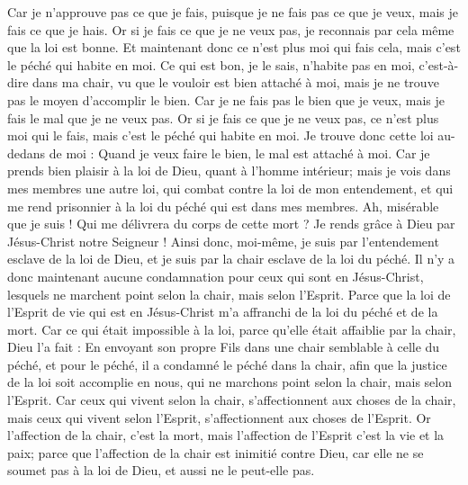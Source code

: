 \begin{multicols}{2}
Car je n'approuve pas ce que je fais, puisque je ne fais pas ce que je veux, mais je fais ce que je hais.
Or si je fais ce que je ne veux pas, je reconnais par cela même que la loi est bonne.
Et maintenant donc ce n'est plus moi qui fais cela, mais c'est le péché qui habite en moi.
Ce qui est bon, je le sais, n'habite pas en moi, c'est-à-dire dans ma chair, vu que le vouloir est bien attaché à moi, mais je ne trouve pas le moyen d'accomplir le bien.
Car je ne fais pas le bien que je veux, mais je fais le mal que je ne veux pas.
Or si je fais ce que je ne veux pas, ce n'est plus moi qui le fais, mais c'est le péché qui habite en moi.
Je trouve donc cette loi au-dedans de moi : Quand je veux faire le bien, le mal est attaché à moi.
Car je prends bien plaisir à la loi de Dieu, quant à l'homme intérieur;
mais je vois dans mes membres une autre loi, qui combat contre la loi de mon entendement, et qui me rend prisonnier à la loi du péché qui est dans mes membres.
Ah, misérable que je suis ! Qui me délivrera du corps de cette mort ?
Je rends grâce à Dieu par Jésus-Christ notre Seigneur ! Ainsi donc, moi-même, je suis par l'entendement esclave de la loi de Dieu, et je suis par la chair esclave de la loi du péché.
\VerseOne{}Il n'y a donc maintenant aucune condamnation pour ceux qui sont en Jésus-Christ, lesquels ne marchent point selon la chair, mais selon l'Esprit.
Parce que la loi de l'Esprit de vie qui est en Jésus-Christ m'a affranchi de la loi du péché et de la mort.
Car ce qui était impossible à la loi, parce qu'elle était affaiblie par la chair, Dieu l'a fait : En envoyant son propre Fils dans une chair semblable à celle du péché, et pour le péché, il a condamné le péché dans la chair,
afin que la justice de la loi soit accomplie en nous, qui ne marchons point selon la chair, mais selon l'Esprit.
Car ceux qui vivent selon la chair, s'affectionnent aux choses de la chair, mais ceux qui vivent selon l'Esprit, s'affectionnent aux choses de l'Esprit.
Or l'affection de la chair, c'est la mort, mais l'affection de l'Esprit c'est la vie et la paix;
parce que l'affection de la chair est inimitié contre Dieu, car elle ne se soumet pas à la loi de Dieu, et aussi ne le peut-elle pas.

\end{multicols}
